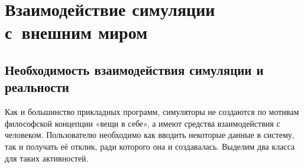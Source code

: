 \chapter{Взаимодействие симуляции с~внешним миром}\label{chapter13}


\section[Необходимость взаимодействия]{Необходимость взаимодействия симуляции и реальности}

Как и большинство прикладных программ, симуляторы не создаются по мотивам философской концепции «вещи в себе», а имеют средства взаимодействия с человеком. Пользователю необходимо как вводить некоторые данные в систему, так и получать её отклик, ради которого она и создавалась. Выделим два класса для таких активностей.

